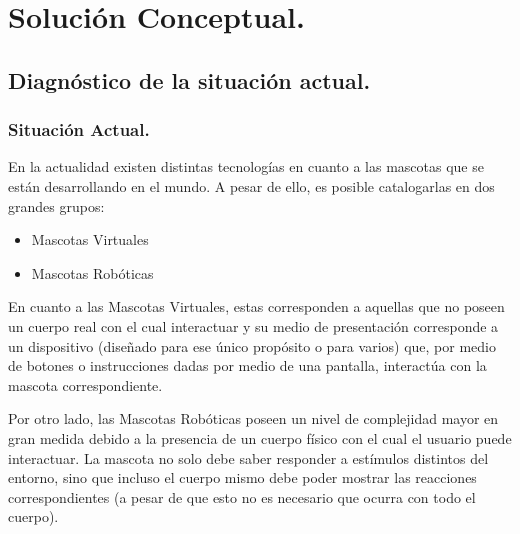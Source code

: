 \section{Soluci\'on Conceptual.}
\subsection{Diagn\'ostico de la situaci\'on actual.}
\subsubsection{Situaci\'on Actual.}

En la actualidad existen distintas tecnolog\'ias en cuanto a las mascotas que se est\'an desarrollando en el mundo. A pesar de ello, es posible catalogarlas en dos grandes grupos:

\begin{itemize}
\item Mascotas Virtuales
\item Mascotas Rob\'oticas
\end{itemize}

En cuanto a las Mascotas Virtuales, estas corresponden a aquellas que no poseen un cuerpo real con el cual interactuar y su medio de presentaci\'on corresponde a un dispositivo (dise\~nado para ese \'unico prop\'osito o para varios) que, por medio de botones o instrucciones dadas por medio de una pantalla, interact\'ua con la mascota correspondiente.

Por otro lado, las Mascotas Rob\'oticas poseen un nivel de complejidad mayor en gran medida debido a la presencia de un cuerpo f\'isico con el cual el usuario puede interactuar. La mascota no solo debe saber responder a est\'imulos distintos del entorno, sino que incluso el cuerpo mismo debe poder mostrar las reacciones correspondientes (a pesar de que esto no es necesario que ocurra con todo el cuerpo).

